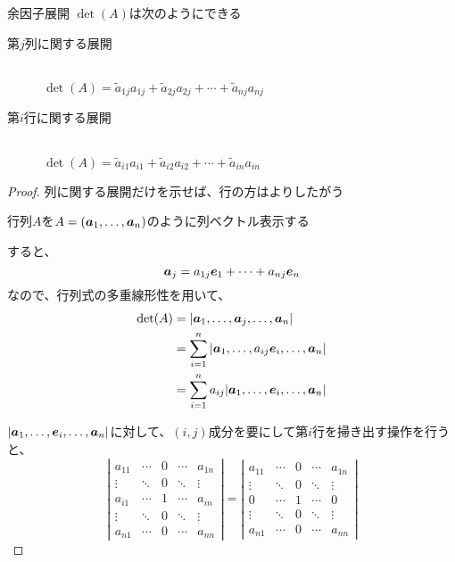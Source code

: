 \documentclass[../../../topic_linear-algebra]{subfiles}
\begin{document}
\begin{theorem*}{余因子展開}
  $\det(A)$は次のようにできる
  \begin{description}
    \item[第$j$列に関する展開]~\\ $\det(A) = \tilde{a}_{1j} a_{1j} + \tilde{a}_{2j} a_{2j} + \cdots + \tilde{a}_{nj} a_{nj}$
    \item[第$i$行に関する展開]~\\ $\det(A) = \tilde{a}_{i1} a_{i1} + \tilde{a}_{i2} a_{i2} + \cdots + \tilde{a}_{in} a_{in}$
  \end{description}
\end{theorem*}

\begin{proof}
  列に関する展開だけを示せば、行の方はよりしたがう

  \br

  行列$A$を$A = (\vb*{a}_1, \ldots, \vb*{a}_n)$のように列ベクトル表示する

  すると、
  \begin{equation*}
    \vb*{a}_j = a_{1j} \vb*{e}_1 + \cdots + a_{nj} \vb*{e}_n
  \end{equation*}
  なので、行列式の多重線形性を用いて、
  \begin{align*}
    \det(A) & = | \vb*{a}_1, \ldots, \vb*{a}_j, \ldots, \vb*{a}_n |                       \\
            & = \sum_{i=1}^{n} | \vb*{a}_1, \ldots, a_{ij} \vb*{e}_i, \ldots, \vb*{a}_n | \\
            & = \sum_{i=1}^{n} a_{ij} | \vb*{a}_1, \ldots, \vb*{e}_i, \ldots, \vb*{a}_n |
  \end{align*}

  $| \vb*{a}_1, \ldots, \vb*{e}_i, \ldots, \vb*{a}_n |$に対して、$(i,j)$成分を要にして第$i$行を掃き出す操作を行うと、
  \begin{equation*}
    \left| \begin{matrix}
      a_{11} & \cdots & 0 & \cdots & a_{1n} \\
      \vdots & \ddots & 0 & \ddots & \vdots \\
      a_{i1} & \cdots & 1 & \cdots & a_{in} \\
      \vdots & \ddots & 0 & \ddots & \vdots \\
      a_{n1} & \cdots & 0 & \cdots & a_{nn}
    \end{matrix} \right| = \left| \begin{matrix}
      a_{11} & \cdots & 0 & \cdots & a_{1n} \\
      \vdots & \ddots & 0 & \ddots & \vdots \\
      0      & \cdots & 1 & \cdots & 0      \\
      \vdots & \ddots & 0 & \ddots & \vdots \\
      a_{n1} & \cdots & 0 & \cdots & a_{nn}
    \end{matrix} \right|
  \end{equation*}


\end{proof}
\end{document}
